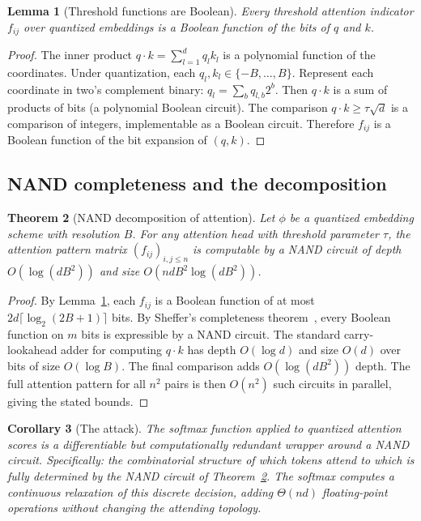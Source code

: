 \documentclass[11pt]{article}
\newtheorem{theorem}{Theorem}[section]
\newtheorem{lemma}[theorem]{Lemma}
\newtheorem{corollary}[theorem]{Corollary}
\theoremstyle{definition}
\begin{document}
\begin{lemma}[Threshold functions are Boolean]
\label{lem:thresh-boolean}
Every threshold attention indicator $f_{ij}$ over quantized embeddings is
a Boolean function of the bits of $q$ and $k$.
\end{lemma}

\begin{proof}
The inner product $q \cdot k = \sum_{l=1}^d q_l k_l$ is a polynomial function
of the coordinates. Under quantization, each $q_l, k_l \in \{-B,\ldots,B\}$.
Represent each coordinate in two's complement binary: $q_l = \sum_{b} q_{l,b} 2^b$.
Then $q \cdot k$ is a sum of products of bits (a polynomial Boolean circuit).
The comparison $q \cdot k \geq \tau\sqrt{d}$ is a comparison of integers,
implementable as a Boolean circuit. Therefore $f_{ij}$ is a Boolean function
of the bit expansion of $(q, k)$.
\end{proof}

\subsection{NAND completeness and the decomposition}

\begin{theorem}[NAND decomposition of attention]
\label{thm:main}
Let $\phi$ be a quantized embedding scheme with resolution $B$.
For any attention head with threshold parameter $\tau$,
the attention pattern matrix $(f_{ij})_{i,j \leq n}$ is computable by a
NAND circuit of depth $O(\log(dB^2))$ and size $O(nd B^2 \log(dB^2))$.
\end{theorem}

\begin{proof}
By Lemma~\ref{lem:thresh-boolean}, each $f_{ij}$ is a Boolean function
of at most $2d \lceil \log_2(2B+1) \rceil$ bits.
By Sheffer's completeness theorem~\cite{sheffer1913}, every Boolean function
on $m$ bits is expressible by a NAND circuit. The standard carry-lookahead
adder for computing $q \cdot k$ has depth $O(\log d)$ and size $O(d)$ over
bits of size $O(\log B)$. The final comparison adds $O(\log(dB^2))$ depth.
The full attention pattern for all $n^2$ pairs is then $O(n^2)$ such
circuits in parallel, giving the stated bounds.
\end{proof}

\begin{corollary}[The attack]
\label{cor:attack}
The softmax function applied to quantized attention scores is a differentiable
but computationally redundant wrapper around a NAND circuit. Specifically:
the combinatorial \emph{structure} of which tokens attend to which is fully
determined by the NAND circuit of Theorem~\ref{thm:main}.
The softmax computes a continuous relaxation of this discrete decision,
adding $\Theta(nd)$ floating-point operations without changing the
attending topology.
\end{corollary}
\end{document}

